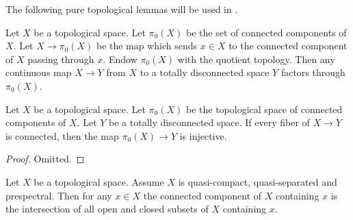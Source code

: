 The following pure topological lemmas will be used in .

\begin{definition}
  \label{def:pi0-to-totally-disconnected}
  \leanok
  Let \(X\) be a topological space. Let \(\pi_0(X)\) be the set of connected components of \(X\). Let \(X \to \pi_0(X)\) be the map which sends \(x \in X\) to the connected component of \(X\) passing through \(x\). Endow \(\pi_0(X)\) with the quotient topology. Then %
  any continuous map \(X \to Y\) from \(X\) to a totally disconnected space \(Y\) factors through \(\pi_0(X)\).
\end{definition}


\begin{lemma}
  \label{thm:pi0-to-totally-disconnected-injective}
  \leanok
  Let \(X\) be a topological space. Let \(\pi_0(X)\) be the topological space of connected components of \(X\). Let \(Y\) be a totally disconnected space. If every fiber of \(X \to Y\) is connected, then the map \(\pi_0(X) \to Y\) is injective.
\end{lemma}

\begin{proof}
  Omitted.
\end{proof}

\begin{lemma}
  \label{thm:connected-component-intersection-closed-open}
  \leanok
  Let $X$ be a topological space. Assume $X$ is quasi-compact, quasi-separated
  and prespectral. Then for any $x \in X$ the connected component of $X$ containing $x$ is
  the intersection of all open and closed subsets of $X$ containing $x$.
\end{lemma}

